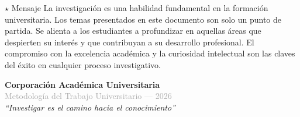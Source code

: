 \documentclass[12pt,a4paper]{article}
\begin{document}
\begin{infobox}{$\star$ Mensaje}
La investigación es una habilidad fundamental en la formación universitaria. Los temas presentados en este documento son solo un punto de partida. Se alienta a los estudiantes a profundizar en aquellas áreas que despierten su interés y que contribuyan a su desarrollo profesional. El compromiso con la excelencia académica y la curiosidad intelectual son las claves del éxito en cualquier proceso investigativo.
\end{infobox}

\vspace{2cm}

\begin{center}
  
  \vspace{0.5cm}
  
  \textcolor{primaryblue}{\Large\textbf{Corporación Académica Universitaria}}\\
  \textcolor{darkgray}{Metodología del Trabajo Universitario --- 2026}\\
  \vspace{0.3cm}
  \textcolor{secondaryblue}{\textit{``Investigar es el camino hacia el conocimiento''}}
\end{center}
\end{document}
